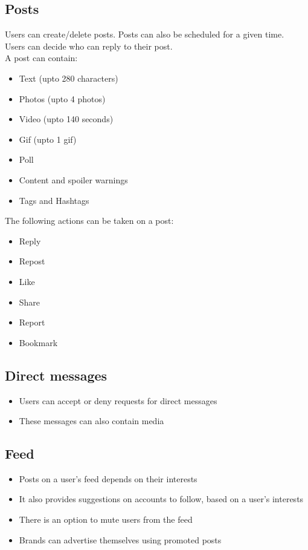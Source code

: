 \documentclass[journal,12pt,onecolumn]{IEEEtran}
\begin{document}
\subsection*{\textbf{Posts}}
\noindent Users can create/delete posts. Posts can also be scheduled for a given time. \\
Users can decide who can reply to their post. \\
A post can contain:
\begin{itemize}
    \item Text (upto 280 characters)
    \item Photos (upto 4 photos)
    \item Video (upto 140 seconds)
    \item Gif (upto 1 gif)
    \item Poll
    \item Content and spoiler warnings
    \item Tags and Hashtags
\end{itemize}
\pagebreak
The following actions can be taken on a post:
\begin{itemize}
    \item Reply 
    \item Repost
    \item Like 
    \item Share
    \item Report
    \item Bookmark
\end{itemize}
%
\subsection*{\textbf{Direct messages}}
\begin{itemize}
    \item Users can accept or deny requests for direct messages
    \item These messages can also contain media
\end{itemize}
%
\subsection*{\textbf{Feed}}
\begin{itemize}
    \item Posts on a user's feed depends on their interests
    \item It also provides suggestions on accounts to follow, based on a user's interests
    \item There is an option to mute users from the feed
    \item Brands can advertise themselves using promoted posts
\end{itemize}
%
\end{document}
